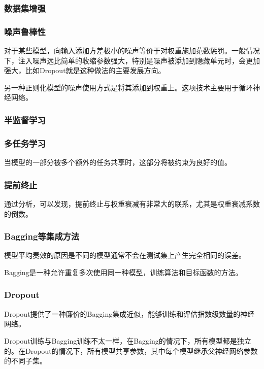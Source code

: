 \subsubsection{数据集增强}

\subsubsection{噪声鲁棒性}

对于某些模型，向输入添加方差极小的噪声等价于对权重施加范数惩罚。一般情况下，注入噪声远比简单的收缩参数强大，特别是噪声被添加到隐藏单元时，会更加强大，比如Dropout就是这种做法的主要发展方向。

另一种正则化模型的噪声使用方式是将其添加到权重上。这项技术主要用于循环神经网络。

\subsubsection{半监督学习}

\subsubsection{多任务学习}

当模型的一部分被多个额外的任务共享时，这部分将被约束为良好的值。

\subsubsection{提前终止}

通过分析，可以发现，提前终止与权重衰减有非常大的联系，尤其是权重衰减系数的倒数。

\subsubsection{Bagging等集成方法}

模型平均奏效的原因是不同的模型通常不会在测试集上产生完全相同的误差。

Bagging是一种允许重复多次使用同一种模型，训练算法和目标函数的方法。

\subsubsection{Dropout}

Dropout提供了一种廉价的Bagging集成近似，能够训练和评估指数级数量的神经网络。

Dropout训练与Bagging训练不太一样，在Bagging的情况下，所有模型都是独立的。在Dropout的情况下，所有模型共享参数，其中每个模型继承父神经网络参数的不同子集。

